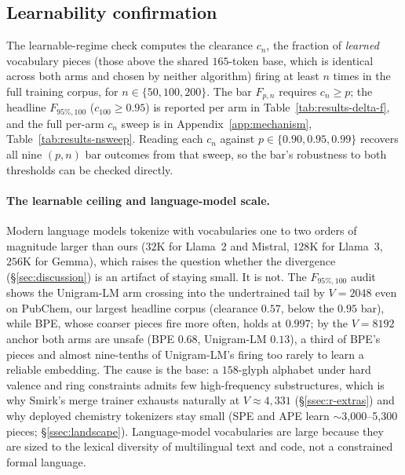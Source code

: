 \documentclass{article}
\begin{document}
\subsection{Learnability confirmation}\label{app:learnability}

The learnable-regime check computes the clearance $c_n$, the fraction of
\emph{learned} vocabulary pieces (those above the shared $165$-token base, which is
identical across both arms and chosen by neither algorithm) firing
at least $n$ times in the full training corpus, for
$n \in \{50, 100, 200\}$. The bar $F_{p,n}$ requires $c_n \ge p$; the headline
$F_{95\%,100}$ ($c_{100} \ge 0.95$) is reported per arm in
Table~\ref{tab:results-delta-f}, and the full per-arm $c_n$ sweep is in
Appendix~\ref{app:mechanism}, Table~\ref{tab:results-nsweep}. Reading each $c_n$
against $p \in \{0.90, 0.95, 0.99\}$ recovers all nine $(p,n)$ bar outcomes from that
sweep, so the bar's robustness to both thresholds can be checked directly.

\paragraph{The learnable ceiling and language-model scale.} Modern language
models tokenize with vocabularies one to two orders of magnitude larger than
ours ($32$K for Llama~2 and Mistral, $128$K for Llama~3, $256$K for Gemma),
which raises the question whether the divergence (\S\ref{sec:discussion}) is an
artifact of staying small. It is not. The $F_{95\%,100}$ audit shows the
Unigram-LM arm crossing into the undertrained tail by $V{=}2048$ even on PubChem,
our largest headline corpus (clearance $0.57$, below the $0.95$ bar), while BPE, whose
coarser pieces fire more often, holds at $0.997$; by the $V{=}8192$ anchor both
arms are unsafe (BPE $0.68$, Unigram-LM $0.13$), a third of BPE's pieces and
almost nine-tenths of Unigram-LM's firing too rarely to learn a reliable
embedding. The cause is the base: a $158$-glyph alphabet under hard valence and
ring constraints admits few high-frequency substructures, which is why Smirk's
merge trainer exhausts naturally at $V\approx4{,}331$ (\S\ref{ssec:r-extras}) and
why deployed chemistry tokenizers stay small (SPE and APE learn
$\sim$3{,}000--5{,}300 pieces; \S\ref{ssec:landscape}). Language-model
vocabularies are large because they are sized to the lexical diversity of
multilingual text and code, not a constrained formal language.
\end{document}
